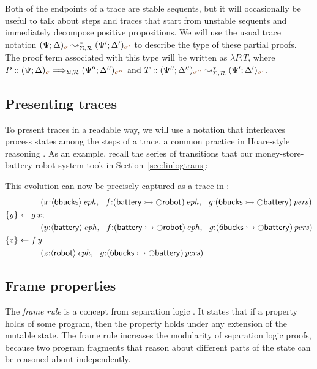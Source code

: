 Both of the endpoints of a trace are stable sequents, but it will
occasionally be useful to talk about steps and traces that start from
unstable sequents and immediately decompose positive propositions. We will use
the usual trace notation $(\Psi; \Delta)_{\lf\sigma}
\leadsto^*_{\Sigma,\subord} (\Psi'; \Delta')_{\lf{\sigma'}}$ to
describe the type of these partial proofs. The proof term
associated with this type will be written as $\lambda P.T$, where $P :: (\Psi;
\Delta)_{\lf\sigma} \Longrightarrow_{\Sigma,\subord} (\Psi'';
\Delta'')_{\lf{\sigma''}}$ and $T :: (\Psi'';
\Delta'')_{\lf{\sigma''}} \leadsto^*_{\Sigma,\subord} (\Psi';
\Delta')_{\lf{\sigma'}}$. 


\subsection{Presenting traces}

To present traces in a readable way, we will use a notation that
interleaves process states among the steps of a trace, a common
practice in Hoare-style reasoning \cite{hoare71proof}.  As an example,
recall the series of transitions that our money-store-battery-robot
system took in Section~\ref{sec:linlogtrans}: 
%

%
This evolution can now be precisely captured as a trace in \sls:
\begin{align*}
&\qquad\qquad
\left(
 x{:}{\langle {\sf 6bucks} \rangle}\,{{\it eph}}, ~~
 f{:}{({\sf battery} \rightarrowtail {\ocircle}{\sf robot})}\,{{\it eph}}, ~~
 g{:}{({\sf 6bucks} \rightarrowtail {\ocircle}{\sf battery})}\,{{\it pers}}
\right)
\\
&\{{y}\} \leftarrow {g\,x};
\\
&\qquad\qquad
\left(
 y{:}{\langle {\sf battery} \rangle}\,{{\it eph}}, ~~
 f{:}{({\sf battery} \rightarrowtail {\ocircle}{\sf robot})}\,{{\it eph}}, ~~
 g{:}{({\sf 6bucks} \rightarrowtail {\ocircle}{\sf battery})}\,{{\it pers}}
\right)
\\
&\{{z}\} \leftarrow {f\,y}
\\
&\qquad\qquad
\left(
 z{:}{\langle {\sf robot} \rangle}\,{{\it eph}}, ~~
 g{:}{({\sf 6bucks} \rightarrowtail {\ocircle}{\sf battery})}\,{{\it pers}}
\right)
\end{align*}

\subsection{Frame properties}

The {\it frame rule} is a concept from separation logic
\cite{reynolds02separation}.  It states that if a property holds of
some program, then the property holds under any extension of the
mutable state. The frame rule increases the modularity of separation
logic proofs, because two program fragments that reason about
different parts of the state can be reasoned about independently.

